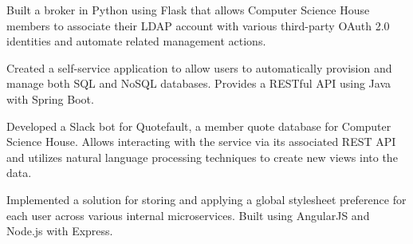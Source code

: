 \documentclass[9pt,letter]{altacv}
\begin{document}


Built a broker in Python using Flask that allows Computer Science House members to associate their LDAP account with various third-party OAuth 2.0 identities and automate related management actions.

\divider

Created a self-service application to allow users to automatically provision and manage both SQL and NoSQL databases. Provides a RESTful API using Java with Spring Boot.

\divider

Developed a Slack bot for Quotefault, a member quote database for Computer Science House. Allows interacting with the service via its associated REST API and utilizes natural language processing techniques to create new views into the data.

\divider

Implemented a solution for storing and applying a global stylesheet preference for each user across various internal microservices. Built using AngularJS and Node.js with Express.

%

\clearpage
\end{document}
